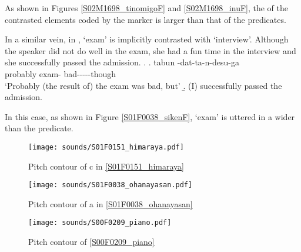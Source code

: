 As shown in Figures \ref{S02M1698_tinomigoF} and \ref{S02M1698_inuF},
the  of the contrasted elements coded by the  marker  is larger than that of the predicates.

In a similar vein,
in \Next,
 `exam' is implicitly contrasted with  `interview'.
Although the speaker did not do well in the exam,
she had a fun time in the interview and she successfully passed the admission.
\ex.\label{S01F0038_siken}
 \ag. tabun  -dat-ta-n-desu-ga \tp{\dvline} \\
 	probably exam- bad-----though {} \\
	`Probably (the result of) the exam was bad, but'
 \b. (I) successfully passed the admission.

In this case,
as shown in Figure \ref{S01F0038_sikenF},
 `exam' is uttered in a wider  than the predicate.

\begin{figure}
	\begin{center}
	\texttt{[image: sounds/S01F0151\_himaraya.pdf]}
	\caption{Pitch contour of c in \ref{S01F0151_himaraya}}
	\label{S01F0151_himarayaF}
	\end{center}
\end{figure}
\begin{figure}
	\begin{center}
	\texttt{[image: sounds/S01F0038\_ohanayasan.pdf]}
	\caption{Pitch contour of a in \ref{S01F0038_ohanayasan}}
	\label{S01F0038_ohanayasanF}
	\end{center}
\end{figure}
\begin{figure}
	\begin{center}
	\texttt{[image: sounds/S00F0209\_piano.pdf]}
	\caption{Pitch contour of \ref{S00F0209_piano}}
	\label{S00F0209_pianoF}
	\end{center}
\end{figure}


